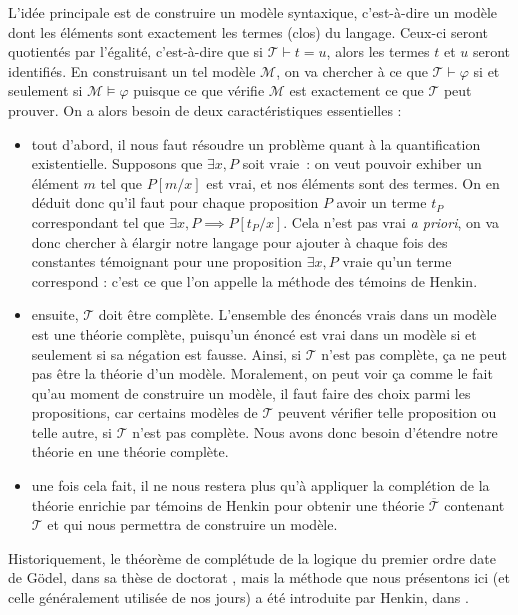 L'idée principale est de construire un modèle syntaxique, c'est-à-dire un modèle
dont les éléments sont exactement les termes (clos) du langage. Ceux-ci seront
quotientés par l'égalité, c'est-à-dire que si $\mathcal T \vdash t = u$, alors
les termes $t$ et $u$ seront identifiés. En construisant un tel modèle
$\mathcal M$, on va chercher à ce que $\mathcal T \vdash \varphi$ si et
seulement si $\mathcal M\vDash \varphi$ puisque ce que vérifie $\mathcal M$ est
exactement ce que $\mathcal T$ peut prouver. On a alors besoin de deux
caractéristiques essentielles :
\begin{itemize}
\item tout d'abord, il nous faut résoudre un problème quant à la quantification
  existentielle. Supposons que $\exists x,P$ soit vraie~: on veut pouvoir
  exhiber un élément $m$ tel que $P[m/x]$ est vrai, et nos éléments sont des
  termes. On en déduit donc qu'il faut pour chaque proposition $P$ avoir un
  terme $t_P$ correspondant tel que $\exists x, P \implies P[t_P/x]$. Cela n'est
  pas vrai \textit{a priori}, on va donc chercher à élargir notre langage pour
  ajouter à chaque fois des constantes témoignant pour une proposition
  $\exists x,P$ vraie qu'un terme correspond : c'est ce que l'on appelle la
  méthode des témoins de Henkin.
\item ensuite, $\mathcal T$ doit être complète. L'ensemble des énoncés
  vrais dans un modèle est une théorie complète, puisqu'un énoncé est vrai dans
  un modèle si et seulement si sa négation est fausse. Ainsi, si $\mathcal T$
  n'est pas complète, ça ne peut pas être la théorie d'un modèle. Moralement, on
  peut voir ça comme le fait qu'au moment de construire un modèle, il faut faire
  des choix parmi les propositions, car certains modèles de $\mathcal T$ peuvent
  vérifier telle proposition ou telle autre, si $\mathcal T$ n'est pas complète.
  Nous avons donc besoin d'étendre notre théorie en une théorie complète.
\item une fois cela fait, il ne nous restera plus qu'à appliquer la complétion
  de la théorie enrichie par témoins de Henkin pour obtenir une théorie
  $\overline{\mathcal T}$ contenant $\mathcal T$ et qui nous permettra de
  construire un modèle.
\end{itemize}

Historiquement, le théorème de complétude de la logique du premier ordre date de
Gödel, dans sa thèse de doctorat \cite{GödelCompleteness}, mais la méthode que
nous présentons ici (et celle généralement utilisée de nos jours) a été
introduite par Henkin, dans \cite{HenkinCompleteness}.

